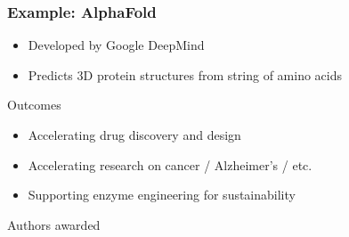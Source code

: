 \begin{frame}\frametitle{Example: AlphaFold}
    
    \begin{figure}
       \centering
    \end{figure}

\end{frame}

\begin{frame}

    \begin{itemize}
        \item Developed by Google DeepMind 
            \vspace{0.5em}
        \item Predicts 3D protein structures from string of amino acids
            \vspace{0.5em}
    \end{itemize}


    \vspace{0.5em}
    Outcomes

    \begin{itemize}
        \item Accelerating drug discovery and design
            \vspace{0.5em}
        \item Accelerating research on cancer / Alzheimer's / etc.
            \vspace{0.5em}
        \item Supporting enzyme engineering for sustainability
    \end{itemize}

    \vspace{0.5em}
    \vspace{0.5em}
    Authors awarded 

\end{frame}



